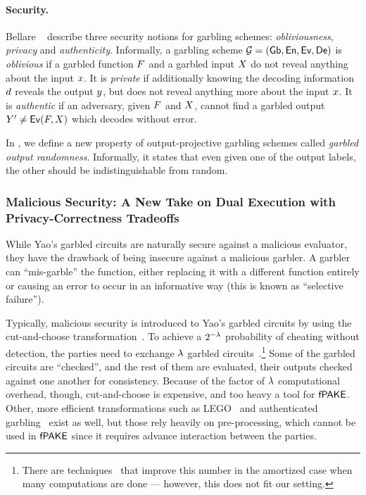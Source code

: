 \paragraph{Security.}
\label{sec:ygc_security}
Bellare \etal~\cite{CCS:BelHoaRog12} describe three security notions for garbling schemes: 
\emph{obliviousness}, \emph{privacy} and \emph{authenticity}.
Informally, a garbling scheme $\mathcal{G} = (\mathsf{Gb}, \mathsf{En}, \mathsf{Ev}, \mathsf{De})$ is \emph{oblivious} if a garbled function $F$ and a garbled input $X$ do not reveal anything about the input $x$. 
It is \emph{private} if additionally knowing the decoding information $d$ reveals the output $y$, but does not reveal anything more about the input $x$.
It is \emph{authentic} if an adversary, given $F$ and $X$, cannot find a garbled output $Y' \neq \mathsf{Ev}(F, X)$ which decodes without error.

In , we define a new property of output-projective garbling schemes called \emph{garbled output randomness}.
Informally, it states that even given one of the output labels, the other should be indistinguishable from random.

\subsubsection{Malicious Security: A New Take on Dual Execution with Privacy-Correctness Tradeoffs}
\label{sec:YGCbackgroundOurs}

While Yao's garbled circuits are naturally secure against a malicious evaluator, they have the drawback of being insecure against a malicious garbler.
A garbler can ``mis-garble'' the function, either replacing it with a different function entirely or causing an error to occur in an informative way (this is known as ``selective failure'').

Typically, malicious security is introduced to Yao's garbled circuits by using the cut-and-choose transformation~\cite{JC:LinPin15,C:Lindell13,C:HuaKatEva13}. 
To achieve a $2^{-\lambda}$ probability of cheating without detection, the parties need to exchange $\lambda$ garbled circuits~\cite{C:Lindell13}.\footnote{
There are techniques~\cite{C:LinRiv14} that improve this number in the amortized case when many computations are done --- however, this does not fit our setting.}
Some of the garbled circuits are ``checked'', and the rest of them are evaluated, their outputs checked against one another for consistency. 
Because of the factor of $\lambda$ computational overhead, though, cut-and-choose is expensive, and too heavy a tool for $\textsf{fPAKE}$.
Other, more efficient transformations such as LEGO~\cite{TCC:NieOrl09} and authenticated garbling~\cite{CCS:WanRanKat17a} exist as well, but those rely heavily on pre-processing, which cannot be used in $\textsf{fPAKE}$ since it requires advance interaction between the parties.

